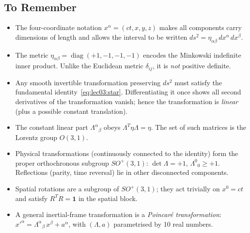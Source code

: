 \subsection*{To Remember}

\begin{itemize}
  \item The four-coordinate notation $x^\alpha = (ct,x,y,z)$ makes
    all components carry dimensions of length and allows the interval to
    be written $ds^2 = \eta_{\alpha\beta}\,dx^\alpha\,dx^\beta$.

  \item The metric $\eta_{\alpha\beta} = \operatorname{diag}(+1,-1,-1,-1)$
    encodes the Minkowski indefinite inner product.  Unlike the Euclidean
    metric $\delta_{ij}$, it is \emph{not} positive definite.

  \item Any smooth invertible transformation preserving $ds^2$ must
    satisfy the fundamental identity~\eqref{eq:lec03:star}.
    Differentiating it once shows all second derivatives of the
    transformation vanish; hence the transformation is \emph{linear}
    (plus a possible constant translation).

  \item The constant linear part $\Lambda^\alpha{}_\beta$
    obeys $\Lambda^T\eta\Lambda = \eta$.  The set of such matrices is
    the Lorentz group $O(3,1)$.

  \item Physical transformations (continuously connected to the
    identity) form the proper orthochronous subgroup $SO^+(3,1)$:
    $\det\Lambda = +1$, $\Lambda^0{}_0 \ge +1$.  Reflections (parity,
    time reversal) lie in other disconnected components.

  \item Spatial rotations are a subgroup of $SO^+(3,1)$; they act
    trivially on $x^0 = ct$ and satisfy $R^T R = \mathbf{1}$ in the
    spatial block.

  \item A general inertial-frame transformation is a \emph{Poincaré
    transformation}: $x'^\alpha = \Lambda^\alpha{}_\beta\,x^\beta + a^\alpha$,
    with $(\Lambda,a)$ parametrised by 10 real numbers.
\end{itemize}

